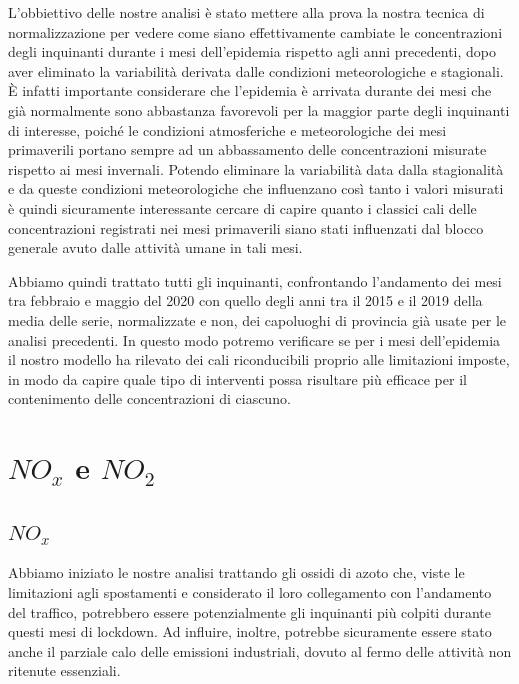 \documentclass[a4paper]{report}
\begin{document}
L'obbiettivo delle nostre analisi è stato mettere alla prova la nostra tecnica di normalizzazione per vedere come siano effettivamente cambiate le concentrazioni degli inquinanti durante i mesi dell'epidemia rispetto agli anni precedenti, dopo aver eliminato la variabilità derivata dalle condizioni meteorologiche e stagionali. È infatti importante considerare che l'epidemia è arrivata durante dei mesi che già normalmente sono abbastanza favorevoli per la maggior parte degli inquinanti di interesse, poiché le condizioni atmosferiche e meteorologiche dei mesi primaverili portano sempre ad un abbassamento delle concentrazioni misurate rispetto ai mesi invernali.
Potendo eliminare la variabilità data dalla stagionalità e da queste condizioni meteorologiche che influenzano così tanto i valori misurati è quindi sicuramente interessante cercare di capire quanto i classici cali delle concentrazioni registrati nei mesi primaverili siano stati influenzati dal blocco generale avuto dalle attività umane in tali mesi.

Abbiamo quindi trattato tutti gli inquinanti, confrontando l'andamento dei mesi tra febbraio e maggio del 2020 con quello degli anni tra il 2015 e il 2019 della media delle serie, normalizzate e non, dei capoluoghi di provincia già usate per le analisi precedenti. In questo modo potremo verificare se per i mesi dell'epidemia il nostro modello ha rilevato dei cali riconducibili proprio alle limitazioni imposte, in modo da capire quale tipo di interventi possa risultare più efficace
 per il contenimento delle concentrazioni di ciascuno.

\section{$NO_x$ e $NO_2$}
\subsection{$NO_x$}
Abbiamo iniziato le nostre analisi trattando gli ossidi di azoto che, viste le limitazioni agli spostamenti e considerato il loro collegamento con l'andamento del traffico, potrebbero essere potenzialmente gli inquinanti più colpiti durante questi mesi di lockdown. Ad influire, inoltre, potrebbe sicuramente essere stato anche il parziale calo delle emissioni industriali, dovuto al fermo delle attività non ritenute essenziali.
\end{document}

